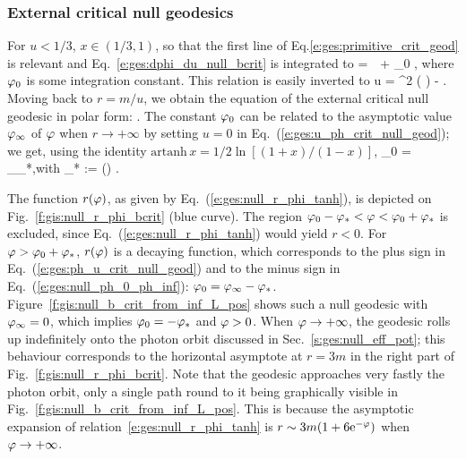 \subsubsection{External critical null geodesics}

For $u<1/3$, $x\in(1/3, 1)$, so that the first line of Eq.\eqref{e:ges:primitive_crit_geod}
is relevant and Eq.~\eqref{e:ges:dphi_du_null_bcrit} is integrated to
\be \label{e:ges:ph_u_crit_null_geod}
    \ph =  \,\,  + \ph_0 ,
\ee
where $\varphi_0$ is some integration constant. This relation is easily inverted
to
\be \label{e:ges:u_ph_crit_null_geod}
    u =   \tanh^2 \left( \right) -  .
\ee
Moving back to $r = m/u$, we obtain the equation of the external critical
null geodesic in polar form:
\be \label{e:ges:null_r_phi_tanh}
   .
\ee
The constant $\varphi_0$ can be related to the asymptotic value $\varphi_\infty$ of $\varphi$
when $r\to +\infty$ by setting $u=0$ in Eq.~(\ref{e:ges:u_ph_crit_null_geod});
we get, using the identity $\mathrm{artanh}\,  x = 1/2\ln[(1+x)/(1-x)]$,
\be \label{e:ges:null_ph_0_ph_inf}
    \ph_0 = \ph_\infty \pm \ph_*,\quad\mbox{with}\quad
    \ph_* := \ln\left(\right)
    .
\ee

The function $r(\varphi)$, as given by Eq.~(\ref{e:ges:null_r_phi_tanh}), is
depicted on Fig.~\ref{f:gis:null_r_phi_bcrit} (blue curve).
The region $\varphi_0-\varphi_* < \varphi < \varphi_0 + \varphi_*$ is excluded, since
Eq.~(\ref{e:ges:null_r_phi_tanh}) would yield $r<0$. For $\varphi > \varphi_0 + \varphi_*$,
$r(\varphi)$ is a decaying
function, which corresponds to the
plus sign in Eq.~(\ref{e:ges:ph_u_crit_null_geod}) and to the minus sign in
Eq.~(\ref{e:ges:null_ph_0_ph_inf}): $\varphi_0 = \varphi_\infty - \varphi_*$.
Figure~\ref{f:gis:null_b_crit_from_inf_L_pos} shows such a null geodesic with
$\varphi_\infty=0$, which implies $\varphi_0 = - \varphi_*$ and $\varphi>0$.
When $\varphi\to +\infty$, the geodesic rolls up indefinitely onto the photon
orbit discussed in Sec.~\ref{s:ges:null_eff_pot}; this
behaviour corresponds to the horizontal asymptote at $r=3m$ in
the right part of Fig.~\ref{f:gis:null_r_phi_bcrit}.
Note that the geodesic approaches very fastly the photon orbit, only a single
path round to it being graphically visible in Fig.~\ref{f:gis:null_b_crit_from_inf_L_pos}.
This is because the asymptotic expansion of relation~\eqref{e:ges:null_r_phi_tanh} is
$r\sim 3m(1+ 6\mathrm{e}^{-\varphi})$ when $\varphi\to+\infty$.

